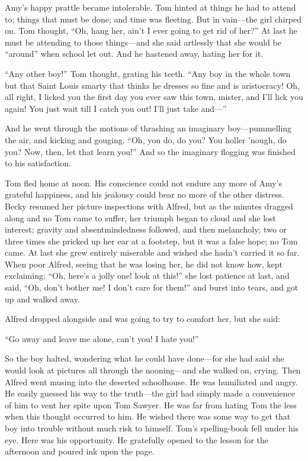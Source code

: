 \documentclass{book}
\begin{document}
Amy’s happy prattle became intolerable. Tom hinted at things he had to attend to; things that must be done; and time was fleeting. But in vain—the girl chirped on. Tom thought, “Oh, hang her, ain’t I ever going to get rid of her?” At last he must be attending to those things—and she said artlessly that she would be “around” when school let out. And he hastened away, hating her for it.

“Any other boy!” Tom thought, grating his teeth. “Any boy in the whole town but that Saint Louis smarty that thinks he dresses so fine and is aristocracy! Oh, all right, I licked you the first day you ever saw this town, mister, and I’ll lick you again! You just wait till I catch you out! I’ll just take and—”

And he went through the motions of thrashing an imaginary boy—pummelling the air, and kicking and gouging. “Oh, you do, do you? You holler ’nough, do you? Now, then, let that learn you!” And so the imaginary flogging was finished to his satisfaction.

Tom fled home at noon. His conscience could not endure any more of Amy’s grateful happiness, and his jealousy could bear no more of the other distress. Becky resumed her picture inspections with Alfred, but as the minutes dragged along and no Tom came to suffer, her triumph began to cloud and she lost interest; gravity and absentmindedness followed, and then melancholy; two or three times she pricked up her ear at a footstep, but it was a false hope; no Tom came. At last she grew entirely miserable and wished she hadn’t carried it so far. When poor Alfred, seeing that he was losing her, he did not know how, kept exclaiming: “Oh, here’s a jolly one! look at this!” she lost patience at last, and said, “Oh, don’t bother me! I don’t care for them!” and burst into tears, and got up and walked away.

Alfred dropped alongside and was going to try to comfort her, but she said:

“Go away and leave me alone, can’t you! I hate you!”

So the boy halted, wondering what he could have done—for she had said she would look at pictures all through the nooning—and she walked on, crying. Then Alfred went musing into the deserted schoolhouse. He was humiliated and angry. He easily guessed his way to the truth—the girl had simply made a convenience of him to vent her spite upon Tom Sawyer. He was far from hating Tom the less when this thought occurred to him. He wished there was some way to get that boy into trouble without much risk to himself. Tom’s spelling-book fell under his eye. Here was his opportunity. He gratefully opened to the lesson for the afternoon and poured ink upon the page.
\end{document}
